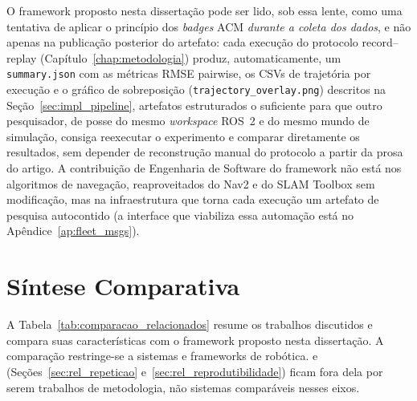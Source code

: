 O framework proposto nesta dissertação pode ser lido, sob essa lente, como uma
tentativa de aplicar o princípio dos \textit{badges} ACM \emph{durante a coleta
dos dados}, e não apenas na publicação posterior do artefato: cada execução do
protocolo record--replay (Capítulo~\ref{chap:metodologia}) produz, automaticamente,
um \texttt{summary.json} com as métricas RMSE pairwise, os CSVs de trajetória por
execução e o gráfico de sobreposição (\texttt{trajectory\_\allowbreak overlay.png}) descritos
na Seção~\ref{sec:impl_pipeline}, artefatos estruturados o suficiente para que
outro pesquisador, de posse do mesmo \textit{workspace} ROS~2 e do mesmo mundo de
simulação, consiga reexecutar o experimento e comparar diretamente os resultados,
sem depender de reconstrução manual do protocolo a partir da prosa do artigo.
A contribuição de Engenharia de Software do framework não está nos algoritmos de
navegação, reaproveitados do Nav2 e do SLAM Toolbox sem modificação, mas na
infraestrutura que torna cada execução um artefato de pesquisa autocontido (a
interface que viabiliza essa automação está no Apêndice~\ref{ap:fleet_msgs}).

\section{Síntese Comparativa}
\label{sec:rel_sintese}

A Tabela~\ref{tab:comparacao_relacionados} resume os trabalhos discutidos e
compara suas características com o framework proposto nesta dissertação. A
comparação restringe-se a sistemas e frameworks de robótica.
 e 
(Seções~\ref{sec:rel_repeticao} e~\ref{sec:rel_reprodutibilidade}) ficam fora
dela por serem trabalhos de metodologia, não sistemas comparáveis nesses eixos.

